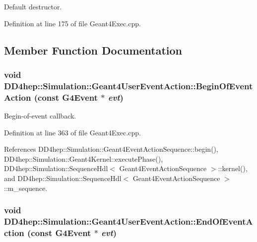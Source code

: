 Default destructor. 

Definition at line 175 of file Geant4Exec.cpp.

\subsection{Member Function Documentation}
\hypertarget{class_d_d4hep_1_1_simulation_1_1_geant4_user_event_action_ab88c990f7010805421170eeb8f86ff86}{
\subsubsection[{BeginOfEventAction}]{\setlength{\rightskip}{0pt plus 5cm}void DD4hep::Simulation::Geant4UserEventAction::BeginOfEventAction (const G4Event $\ast$ {\em evt})}}
\label{class_d_d4hep_1_1_simulation_1_1_geant4_user_event_action_ab88c990f7010805421170eeb8f86ff86}


Begin-\/of-\/event callback. 

Definition at line 363 of file Geant4Exec.cpp.

References DD4hep::Simulation::Geant4EventActionSequence::begin(), DD4hep::Simulation::Geant4Kernel::executePhase(), DD4hep::Simulation::SequenceHdl$<$ Geant4EventActionSequence $>$::kernel(), and DD4hep::Simulation::SequenceHdl$<$ Geant4EventActionSequence $>$::m\_\-sequence.\hypertarget{class_d_d4hep_1_1_simulation_1_1_geant4_user_event_action_a5fe13da05fc37d5d69ed814b061cada0}{
\subsubsection[{EndOfEventAction}]{\setlength{\rightskip}{0pt plus 5cm}void DD4hep::Simulation::Geant4UserEventAction::EndOfEventAction (const G4Event $\ast$ {\em evt})}}
\label{class_d_d4hep_1_1_simulation_1_1_geant4_user_event_action_a5fe13da05fc37d5d69ed814b061cada0}


